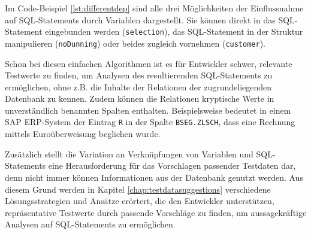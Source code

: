 Im Code-Beispiel \ref{lst:differentdep} sind alle drei Möglichkeiten der Einflussnahme auf SQL-Statements durch Variablen dargestellt.
Sie können direkt in das SQL-Statement eingebunden werden (\texttt{selection}), das SQL-Statement in der Struktur manipulieren (\texttt{noDunning}) oder beides zugleich vornehmen (\texttt{customer}).

Schon bei diesen einfachen Algorithmen ist es für Entwickler schwer, relevante Testwerte zu finden, um Analysen des resultierenden SQL-Statements zu ermöglichen, ohne z.B. die Inhalte der Relationen der zugrundeliegenden Datenbank zu kennen.
Zudem können die Relationen kryptische Werte in unverständlich benannten Spalten enthalten.
Beispielsweise bedeutet in einem SAP ERP-System der Eintrag \texttt{R} in der Spalte \texttt{BSEG.ZLSCH}, dass eine Rechnung mittels Euroüberweisung beglichen wurde.

Zusätzlich stellt die Variation an Verknüpfungen von Variablen und SQL-Statements eine Herausforderung für das Vorschlagen passender Testdaten dar, denn nicht immer können Informationen aus der Datenbank genutzt werden.
Aus diesem Grund werden in Kapitel \ref{chap:testdatasuggestions} verschiedene Lösungsstrategien und Ansätze erörtert, die den Entwickler unterstützen, repräsentative Testwerte durch passende Vorschläge zu finden, um aussagekräftige Analysen auf SQL-Statements zu ermöglichen.
